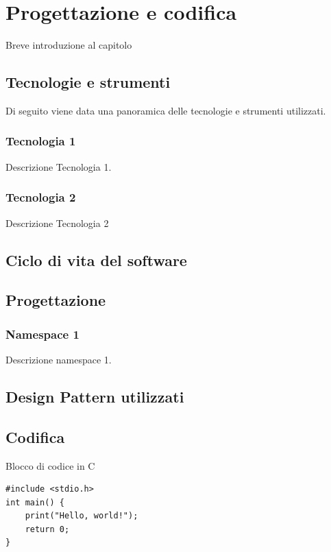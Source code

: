 \chapter{Progettazione e codifica}
\label{chap:tecnologie-architettura-progettazione}
Breve introduzione al capitolo

\section{Tecnologie e strumenti}
\label{sec:tecnologie-strumenti}
Di seguito viene data una panoramica delle tecnologie e strumenti utilizzati.

\subsection*{Tecnologia 1}
Descrizione Tecnologia 1.

\subsection*{Tecnologia 2}
Descrizione Tecnologia 2

\section{Ciclo di vita del software}
\label{sec:ciclo-vita-software}

\section{Progettazione}
\label{sec:progettazione}

\subsection{Namespace 1}
Descrizione namespace 1.

\section{Design Pattern utilizzati}

\section{Codifica}
Blocco di codice in C
\begin{listing}[H]
\begin{verbatim}
#include <stdio.h>
int main() {
    print("Hello, world!");
    return 0;
}
\end{verbatim}
\caption{Example of code}
\label{listing:c}
\end{listing}

\newpage